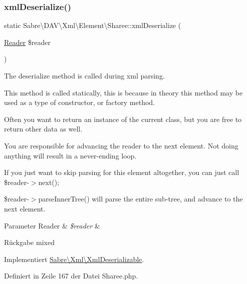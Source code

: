 \subsubsection{\texorpdfstring{xml\+Deserialize()}{xmlDeserialize()}}
{\footnotesize\ttfamily static Sabre\textbackslash{}\+D\+A\+V\textbackslash{}\+Xml\textbackslash{}\+Element\textbackslash{}\+Sharee\+::xml\+Deserialize (\begin{DoxyParamCaption}\item[{\mbox{\hyperlink{class_sabre_1_1_xml_1_1_reader}{Reader}}}]{\$reader }\end{DoxyParamCaption})\hspace{0.3cm}{\ttfamily [static]}}

The deserialize method is called during xml parsing.

This method is called statically, this is because in theory this method may be used as a type of constructor, or factory method.

Often you want to return an instance of the current class, but you are free to return other data as well.

You are responsible for advancing the reader to the next element. Not doing anything will result in a never-\/ending loop.

If you just want to skip parsing for this element altogether, you can just call \$reader-\/$>$next();

\$reader-\/$>$parse\+Inner\+Tree() will parse the entire sub-\/tree, and advance to the next element.


\begin{DoxyParams}[1]{Parameter}
Reader & {\em \$reader} & \\
\hline
\end{DoxyParams}
\begin{DoxyReturn}{Rückgabe}
mixed 
\end{DoxyReturn}


Implementiert \mbox{\hyperlink{interface_sabre_1_1_xml_1_1_xml_deserializable_a19e0eca545b9a0d93f7d6b69085ade30}{Sabre\textbackslash{}\+Xml\textbackslash{}\+Xml\+Deserializable}}.



Definiert in Zeile 167 der Datei Sharee.\+php.

\mbox{\label{class_sabre_1_1_d_a_v_1_1_xml_1_1_element_1_1_sharee_a6f2e1948f0aa0f060714080ce5ab40a2}} 
